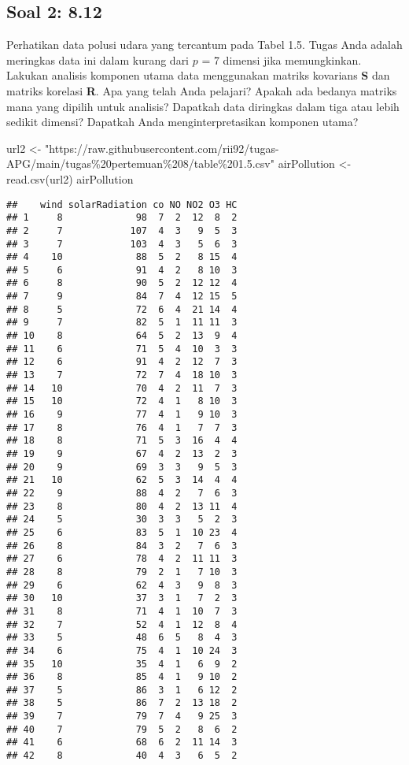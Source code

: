 \documentclass[
]{article}
\newenvironment{Shaded}{\begin{snugshade}}{\end{snugshade}}
\newcommand{\FunctionTok}[1]{\textcolor[rgb]{0.00,0.00,0.00}{#1}}
\newcommand{\NormalTok}[1]{#1}
\newcommand{\OtherTok}[1]{\textcolor[rgb]{0.56,0.35,0.01}{#1}}
\newcommand{\StringTok}[1]{\textcolor[rgb]{0.31,0.60,0.02}{#1}}
\begin{document}
\hypertarget{soal-2-8.12}{%
\subsection{Soal 2: 8.12}\label{soal-2-8.12}}

Perhatikan data polusi udara yang tercantum pada Tabel 1.5. Tugas Anda
adalah meringkas data ini dalam kurang dari \(p\) = 7 dimensi jika
memungkinkan. Lakukan analisis komponen utama data menggunakan matriks
kovarians \textbf{S} dan matriks korelasi \textbf{R}. Apa yang telah
Anda pelajari? Apakah ada bedanya matriks mana yang dipilih untuk
analisis? Dapatkah data diringkas dalam tiga atau lebih sedikit dimensi?
Dapatkah Anda menginterpretasikan komponen utama?

\begin{Shaded}
\begin{Highlighting}[]
\NormalTok{url2 }\OtherTok{\textless{}{-}} \StringTok{"https://raw.githubusercontent.com/rii92/tugas{-}APG/main/tugas\%20pertemuan\%208/table\%201.5.csv"}
\NormalTok{airPollution }\OtherTok{\textless{}{-}} \FunctionTok{read.csv}\NormalTok{(url2)}
\NormalTok{airPollution}
\end{Highlighting}
\end{Shaded}

\begin{verbatim}
##    wind solarRadiation co NO NO2 O3 HC
## 1     8             98  7  2  12  8  2
## 2     7            107  4  3   9  5  3
## 3     7            103  4  3   5  6  3
## 4    10             88  5  2   8 15  4
## 5     6             91  4  2   8 10  3
## 6     8             90  5  2  12 12  4
## 7     9             84  7  4  12 15  5
## 8     5             72  6  4  21 14  4
## 9     7             82  5  1  11 11  3
## 10    8             64  5  2  13  9  4
## 11    6             71  5  4  10  3  3
## 12    6             91  4  2  12  7  3
## 13    7             72  7  4  18 10  3
## 14   10             70  4  2  11  7  3
## 15   10             72  4  1   8 10  3
## 16    9             77  4  1   9 10  3
## 17    8             76  4  1   7  7  3
## 18    8             71  5  3  16  4  4
## 19    9             67  4  2  13  2  3
## 20    9             69  3  3   9  5  3
## 21   10             62  5  3  14  4  4
## 22    9             88  4  2   7  6  3
## 23    8             80  4  2  13 11  4
## 24    5             30  3  3   5  2  3
## 25    6             83  5  1  10 23  4
## 26    8             84  3  2   7  6  3
## 27    6             78  4  2  11 11  3
## 28    8             79  2  1   7 10  3
## 29    6             62  4  3   9  8  3
## 30   10             37  3  1   7  2  3
## 31    8             71  4  1  10  7  3
## 32    7             52  4  1  12  8  4
## 33    5             48  6  5   8  4  3
## 34    6             75  4  1  10 24  3
## 35   10             35  4  1   6  9  2
## 36    8             85  4  1   9 10  2
## 37    5             86  3  1   6 12  2
## 38    5             86  7  2  13 18  2
## 39    7             79  7  4   9 25  3
## 40    7             79  5  2   8  6  2
## 41    6             68  6  2  11 14  3
## 42    8             40  4  3   6  5  2
\end{verbatim}
\end{document}
